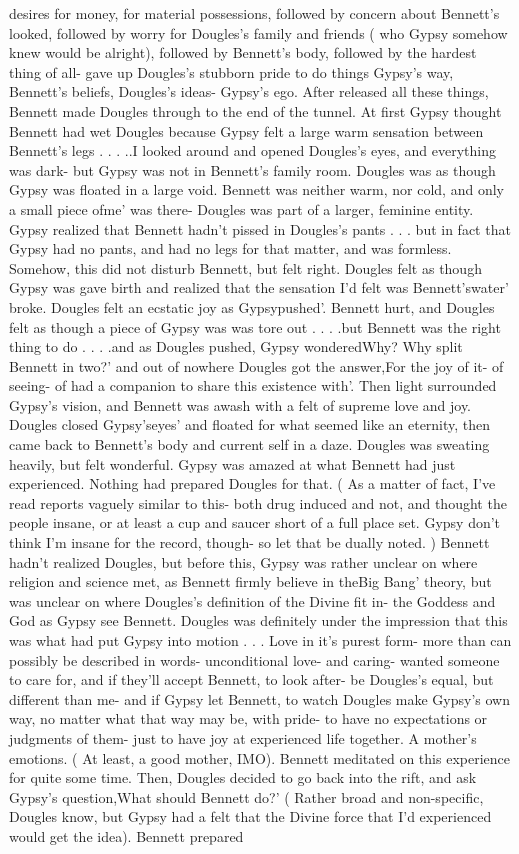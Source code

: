 \documentclass[12pt]{book}
\begin{document}
desires for money, for material possessions, followed by concern about Bennett's looked, followed by worry for Dougles's family and friends ( who Gypsy somehow knew would be alright), followed by Bennett's body, followed by the hardest thing of all- gave up Dougles's stubborn pride to do things Gypsy's way, Bennett's beliefs, Dougles's ideas- Gypsy's ego. After released all these things, Bennett made Dougles through to the end of the tunnel. At first Gypsy thought Bennett had wet Dougles because Gypsy felt a large warm sensation between Bennett's legs . . .  ..I looked around and opened Dougles's eyes, and everything was dark- but Gypsy was not in Bennett's family room. Dougles was as though Gypsy was floated in a large void. Bennett was neither warm, nor cold, and only a small piece ofme' was there- Dougles was part of a larger, feminine entity. Gypsy realized that Bennett hadn't pissed in Dougles's pants . . .  but in fact that Gypsy had no pants, and had no legs for that matter, and was formless. Somehow, this did not disturb Bennett, but felt right. Dougles felt as though Gypsy was gave birth and realized that the sensation I'd felt was Bennett'swater' broke. Dougles felt an ecstatic joy as Gypsypushed'. Bennett hurt, and Dougles felt as though a piece of Gypsy was was tore out . . .  .but Bennett was the right thing to do . . .  .and as Dougles pushed, Gypsy wonderedWhy? Why split Bennett in two?' and out of nowhere Dougles got the answer,For the joy of it- of seeing- of had a companion to share this existence with'. Then light surrounded Gypsy's vision, and Bennett was awash with a felt of supreme love and joy. Dougles closed Gypsy'seyes' and floated for what seemed like an eternity, then came back to Bennett's body and current self in a daze. Dougles was sweating heavily, but felt wonderful. Gypsy was amazed at what Bennett had just experienced. Nothing had prepared Dougles for that. ( As a matter of fact, I've read reports vaguely similar to this- both drug induced and not, and thought the people insane, or at least a cup and saucer short of a full place set. Gypsy don't think I'm insane for the record, though- so let that be dually noted. ) Bennett hadn't realized Dougles, but before this, Gypsy was rather unclear on where religion and science met, as Bennett firmly believe in theBig Bang' theory, but was unclear on where Dougles's definition of the Divine fit in- the Goddess and God as Gypsy see Bennett. Dougles was definitely under the impression that this was what had put Gypsy into motion . . .  Love in it's purest form- more than can possibly be described in words- unconditional love- and caring- wanted someone to care for, and if they'll accept Bennett, to look after- be Dougles's equal, but different than me- and if Gypsy let Bennett, to watch Dougles make Gypsy's own way, no matter what that way may be, with pride- to have no expectations or judgments of them- just to have joy at experienced life together. A mother's emotions. ( At least, a good mother, IMO). Bennett meditated on this experience for quite some time. Then, Dougles decided to go back into the rift, and ask Gypsy's question,What should Bennett do?' ( Rather broad and non-specific, Dougles know, but Gypsy had a felt that the Divine force that I'd experienced would get the idea). Bennett prepared 
\end{document}
